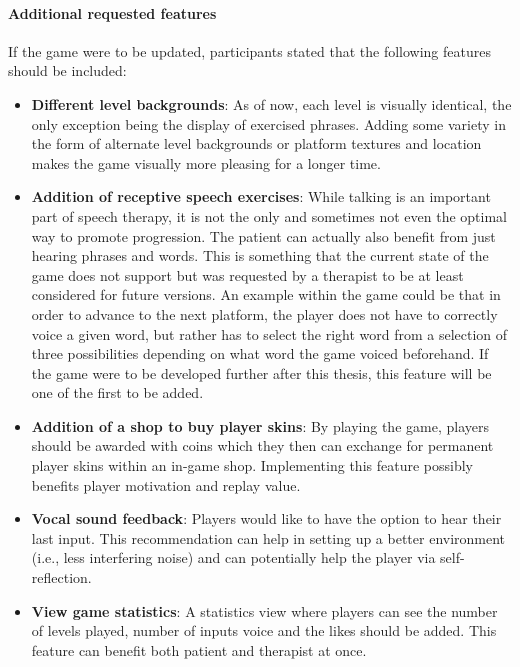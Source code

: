 \documentclass[draft,final]{vutinfth} %
\begin{document}
\paragraph{Additional requested features} If the game were to be updated, participants stated that the following features should be included: 
\begin{itemize}
\item \textbf{Different level backgrounds}: As of now, each level is visually identical, the only exception being the display of exercised phrases. Adding some variety in the form of alternate level backgrounds or platform textures and location makes the game visually more pleasing for a longer time.
\item \textbf{Addition of receptive speech exercises}: While talking is an important part of speech therapy, it is not the only and sometimes not even the optimal way to promote progression. The patient can actually also benefit from just hearing phrases and words. This is something that the current state of the game does not support but was requested by a therapist to be at least considered for future versions. An example within the game could be that in order to advance to the next platform, the player does not have to correctly voice a given word, but rather has to select the right word from a selection of three possibilities depending on what word the game voiced beforehand. If the game were to be developed further after this thesis, this feature will be one of the first to be added.

\item \textbf{Addition of a shop to buy player skins}: By playing the game, players should be awarded with coins which they then can exchange for permanent player skins within an in-game shop. Implementing this feature possibly benefits player motivation and replay value.

\item \textbf{Vocal sound feedback}: Players would like to have the option to hear their last input. This recommendation can help in setting up a better environment (i.e., less interfering noise) and can potentially help the player via self-reflection.

\item \textbf{View game statistics}: A statistics view where players can see the number of levels played, number of inputs voice and the likes should be added. This feature can benefit both patient and therapist at once. 
\end{itemize}
\end{document}
